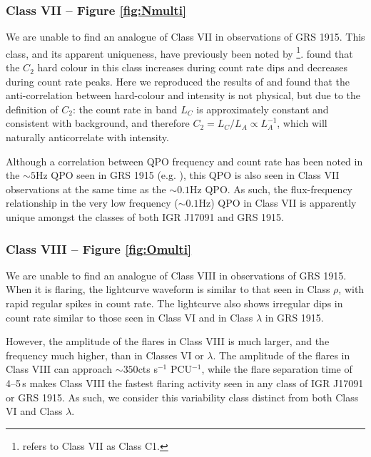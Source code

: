 \subsubsection{Class VII -- Figure \ref{fig:Nmulti}}

\par We are unable to find an analogue of Class VII in observations of GRS 1915.  This class, and its apparent uniqueness, have previously been noted by \citealp{Pahari_IGRClasses}\footnote{\citet{Pahari_IGRClasses} refers to Class VII as Class C1.}.  \citeauthor{Pahari_IGRClasses} found  that the $C_2$ hard colour in this class increases during count rate dips and decreases during count rate peaks.  Here we reproduced the results of \citeauthor{Pahari_IGRClasses} and found that the anti-correlation between hard-colour and intensity is not physical, but due to the definition of $C_2$: the count rate in band $L_C$ is approximately constant and consistent with background, and therefore $C_2=L_C/L_A \propto L_A^{-1}$, which will naturally anticorrelate with intensity.
\par Although a correlation between QPO frequency and count rate has been noted in the $\sim5$Hz QPO seen in GRS 1915 (e.g. \citealp{Markwardt_FluxFreqGRS,Vignarca_FluxFreqGRS}), this QPO is also seen in Class VII observations at the same time as the $\sim0.1$Hz QPO.  As such, the flux-frequency relationship in the very low frequency ($\sim0.1$Hz) QPO in Class VII is apparently unique amongst the classes of both IGR J17091 and GRS 1915.

\subsubsection{Class VIII -- Figure \ref{fig:Omulti}}

\par We are unable to find an analogue of Class VIII in observations of GRS 1915.  When it is flaring, the lightcurve waveform is similar to that seen in Class $\rho$, with rapid regular spikes in count rate.  The lightcurve also shows irregular dips in count rate similar to those seen in Class VI and in Class $\lambda$ in GRS 1915.
\par However, the amplitude of the flares in Class VIII is much larger, and the frequency much higher, than in Classes VI or $\lambda$.  The amplitude of the flares in Class VIII can approach $\sim350$cts s$^{-1}$ PCU$^{-1}$, while the flare separation time of 4--5\,s makes Class VIII the fastest flaring activity seen in any class of IGR J17091 or GRS 1915.  As such, we consider this variability class distinct from both Class VI and Class $\lambda$. 

